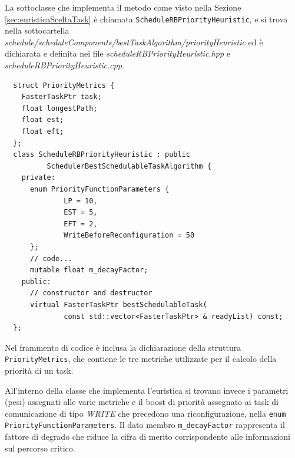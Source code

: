 La sottoclasse che implementa il metodo come visto nella Sezione 
\ref{sec:euristicaSceltaTask} è chiamata \verb+ScheduleRBPriorityHeuristic+, e 
si trova nella sottocartella 
\emph{schedule/scheduleComponents/bestTaskAlgorithm/priorityHeuristic} ed è 
dichiarata e definita nei file \emph{scheduleRBPriorityHeuristic.hpp} e 
\emph{scheduleRBPriorityHeuristic.cpp}.
\newline
\begin{verbatim}
  struct PriorityMetrics {
    FasterTaskPtr task;
    float longestPath;
    float est;
    float eft;
  };
  class ScheduleRBPriorityHeuristic : public 
          SchedulerBestSchedulableTaskAlgorithm {
    private:
      enum PriorityFunctionParameters {
              LP = 10,
              EST = 5,
              EFT = 2,
              WriteBeforeReconfiguration = 50
      };
      // code...
      mutable float m_decayFactor;
    public:
      // constructor and destructor
      virtual FasterTaskPtr bestSchedulableTask(
              const std::vector<FasterTaskPtr> & readyList) const;
  };
\end{verbatim}

Nel frammento di codice è inclusa la dichiarazione della 
struttura \verb+PriorityMetrics+, che contiene le tre metriche utilizzate per 
il calcolo della priorità di un task.

All'interno della classe che implementa l'euristica si trovano invece i 
parametri (pesi) assegnati alle varie metriche e il boost di priorità assegnato 
ai task di comunicazione di tipo \emph{WRITE} che precedono una 
riconfigurazione, nella \verb+enum PriorityFunctionParameters+. Il dato membro 
\verb+m_decayFactor+ rappresenta il fattore di degrado che riduce la cifra di 
merito corrispondente alle informazioni sul percorso critico.

